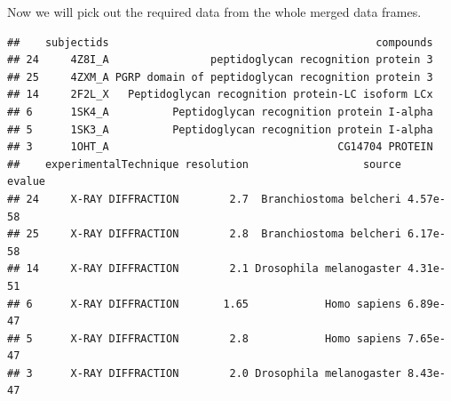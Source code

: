 \documentclass[]{article}
\newenvironment{Shaded}{\begin{snugshade}}{\end{snugshade}}
\newcommand{\KeywordTok}[1]{\textcolor[rgb]{0.13,0.29,0.53}{\textbf{#1}}}
\newcommand{\StringTok}[1]{\textcolor[rgb]{0.31,0.60,0.02}{#1}}
\newcommand{\CommentTok}[1]{\textcolor[rgb]{0.56,0.35,0.01}{\textit{#1}}}
\newcommand{\OperatorTok}[1]{\textcolor[rgb]{0.81,0.36,0.00}{\textbf{#1}}}
\newcommand{\NormalTok}[1]{#1}
\begin{document}
Now we will pick out the required data from the whole merged data
frames.

\begin{Shaded}
\end{Shaded}

\begin{verbatim}
##    subjectids                                          compounds
## 24     4Z8I_A                peptidoglycan recognition protein 3
## 25     4ZXM_A PGRP domain of peptidoglycan recognition protein 3
## 14     2F2L_X   Peptidoglycan recognition protein-LC isoform LCx
## 6      1SK4_A          Peptidoglycan recognition protein I-alpha
## 5      1SK3_A          Peptidoglycan recognition protein I-alpha
## 3      1OHT_A                                    CG14704 PROTEIN
##    experimentalTechnique resolution                  source   evalue
## 24     X-RAY DIFFRACTION        2.7  Branchiostoma belcheri 4.57e-58
## 25     X-RAY DIFFRACTION        2.8  Branchiostoma belcheri 6.17e-58
## 14     X-RAY DIFFRACTION        2.1 Drosophila melanogaster 4.31e-51
## 6      X-RAY DIFFRACTION       1.65            Homo sapiens 6.89e-47
## 5      X-RAY DIFFRACTION        2.8            Homo sapiens 7.65e-47
## 3      X-RAY DIFFRACTION        2.0 Drosophila melanogaster 8.43e-47
\end{verbatim}
\end{document}
